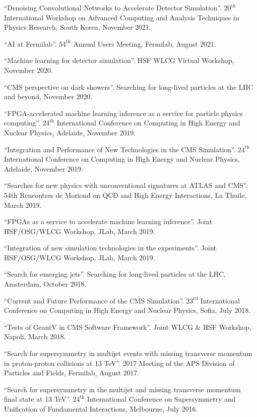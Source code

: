 \begin{description}[leftmargin=12pt,font=\normalfont,labelsep=0em]
\item ``Denoising Convolutional Networks to Accelerate Detector Simulation''. $20^{\text{th}}$ International Workshop on Advanced Computing and Analysis Techniques in Physics Research, South Korea, November 2021.
\item ``AI at Fermilab''. $54^{\text{th}}$ Annual Users Meeting, Fermilab, August 2021.
\item ``Machine learning for detector simulation''. HSF WLCG Virtual Workshop, November 2020.
\item ``CMS perspective on dark showers''. Searching for long-lived particles at the LHC and beyond, November 2020.
\item ``FPGA-accelerated machine learning inference as a service for particle physics computing''. $24^{\text{th}}$ International Conference on Computing in High Energy and Nuclear Physics, Adelaide, November 2019.
\item ``Integration and Performance of New Technologies in the CMS Simulation''. $24^{\text{th}}$ International Conference on Computing in High Energy and Nuclear Physics, Adelaide, November 2019.
\item ``Searches for new physics with unconventional signatures at ATLAS and CMS''. 54th Rencontres de Moriond on QCD and High Energy Interactions, La Thuile, March 2019.
\item ``FPGAs as a service to accelerate machine learning inference''. Joint HSF/OSG/WLCG Workshop, JLab, March 2019.
\item ``Integration of new simulation technologies in the experiments''. Joint HSF/OSG/WLCG Workshop, JLab, March 2019.
\item ``Search for emerging jets''. Searching for long-lived particles at the LHC, Amsterdam, October 2018.
\item ``Current and Future Performance of the CMS Simulation''. $23^{\text{rd}}$ International Conference on Computing in High Energy and Nuclear Physics, Sofia, July 2018.
\item ``Tests of GeantV in CMS Software Framework''. Joint WLCG \& HSF Workshop, Napoli, March 2018.
\item ``Search for supersymmetry in multijet events with missing transverse momentum in proton-proton collisions at 13 TeV''. 2017 Meeting of the APS Division of Particles and Fields, Fermilab, August 2017.
\item ``Search for supersymmetry in the multijet and missing transverse momentum final state at 13 TeV''. $24^{\text{th}}$ International Conference on Supersymmetry and Unification of Fundamental Interactions, Melbourne, July 2016.

\end{description}
